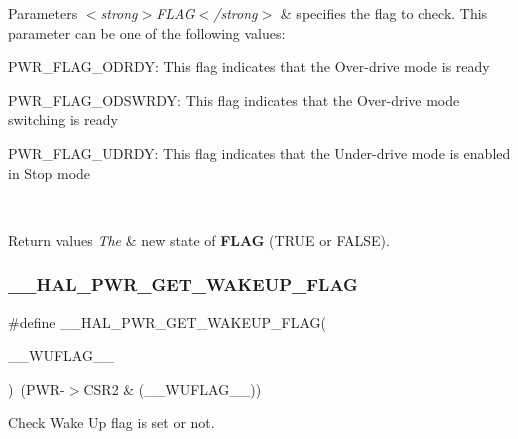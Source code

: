 \begin{DoxyParams}{Parameters}
{\em $<$strong$>$\+F\+L\+A\+G$<$/strong$>$} & specifies the flag to check. This parameter can be one of the following values\+: \begin{DoxyItemize}
\item P\+W\+R\+\_\+\+F\+L\+A\+G\+\_\+\+O\+D\+R\+DY\+: This flag indicates that the Over-\/drive mode is ready \item P\+W\+R\+\_\+\+F\+L\+A\+G\+\_\+\+O\+D\+S\+W\+R\+DY\+: This flag indicates that the Over-\/drive mode switching is ready\end{DoxyItemize}
\begin{DoxyItemize}
\item P\+W\+R\+\_\+\+F\+L\+A\+G\+\_\+\+U\+D\+R\+DY\+: This flag indicates that the Under-\/drive mode is enabled in Stop mode \end{DoxyItemize}
\\
\hline
\end{DoxyParams}

\begin{DoxyRetVals}{Return values}
{\em The} & new state of {\bfseries{F\+L\+AG}} (T\+R\+UE or F\+A\+L\+SE). \\
\hline
\end{DoxyRetVals}
\mbox{\label{group___p_w_r_ex___exported___macro_ga4f35c4eed3de35db5422548943cf8b1b}} 
\subsubsection{\texorpdfstring{\_\_HAL\_PWR\_GET\_WAKEUP\_FLAG}{\_\_HAL\_PWR\_GET\_WAKEUP\_FLAG}}
{\footnotesize\ttfamily \#define \+\_\+\+\_\+\+H\+A\+L\+\_\+\+P\+W\+R\+\_\+\+G\+E\+T\+\_\+\+W\+A\+K\+E\+U\+P\+\_\+\+F\+L\+AG(\begin{DoxyParamCaption}\item[{}]{\+\_\+\+\_\+\+W\+U\+F\+L\+A\+G\+\_\+\+\_\+ }\end{DoxyParamCaption})~(P\+WR-\/$>$C\+S\+R2 \& (\+\_\+\+\_\+\+W\+U\+F\+L\+A\+G\+\_\+\+\_\+))}



Check Wake Up flag is set or not. 


